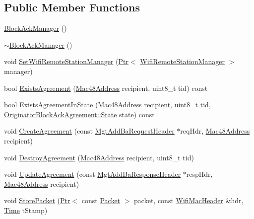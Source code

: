 \subsection*{Public Member Functions}
\begin{DoxyCompactItemize}
\item 
\hyperlink{classns3_1_1BlockAckManager_a7a966d4ae9c3f2172545b76b7ccb8206}{Block\+Ack\+Manager} ()
\item 
\hyperlink{classns3_1_1BlockAckManager_af825fcf5b5c34784c880d95f3d0764af}{$\sim$\+Block\+Ack\+Manager} ()
\item 
void \hyperlink{classns3_1_1BlockAckManager_a7f1b2bae83d50eb0999ed609075571a8}{Set\+Wifi\+Remote\+Station\+Manager} (\hyperlink{classns3_1_1Ptr}{Ptr}$<$ \hyperlink{classns3_1_1WifiRemoteStationManager}{Wifi\+Remote\+Station\+Manager} $>$ manager)
\item 
bool \hyperlink{classns3_1_1BlockAckManager_a4712688bb7764d576c87fd627d3d3aba}{Exists\+Agreement} (\hyperlink{classns3_1_1Mac48Address}{Mac48\+Address} recipient, uint8\+\_\+t tid) const 
\item 
bool \hyperlink{classns3_1_1BlockAckManager_ae13c4678f75ebfda7f63d0521878662b}{Exists\+Agreement\+In\+State} (\hyperlink{classns3_1_1Mac48Address}{Mac48\+Address} recipient, uint8\+\_\+t tid, \hyperlink{classns3_1_1OriginatorBlockAckAgreement_ab33ae8af8c458aca7437a472778e4761}{Originator\+Block\+Ack\+Agreement\+::\+State} state) const 
\item 
void \hyperlink{classns3_1_1BlockAckManager_a44483ff8e6011faf1190dc0f178e66b7}{Create\+Agreement} (const \hyperlink{classns3_1_1MgtAddBaRequestHeader}{Mgt\+Add\+Ba\+Request\+Header} $\ast$req\+Hdr, \hyperlink{classns3_1_1Mac48Address}{Mac48\+Address} recipient)
\item 
void \hyperlink{classns3_1_1BlockAckManager_a4f2adf7575098ab82e1d94466cc9d18a}{Destroy\+Agreement} (\hyperlink{classns3_1_1Mac48Address}{Mac48\+Address} recipient, uint8\+\_\+t tid)
\item 
void \hyperlink{classns3_1_1BlockAckManager_ac5b719210486783186579641e599d362}{Update\+Agreement} (const \hyperlink{classns3_1_1MgtAddBaResponseHeader}{Mgt\+Add\+Ba\+Response\+Header} $\ast$resp\+Hdr, \hyperlink{classns3_1_1Mac48Address}{Mac48\+Address} recipient)
\item 
void \hyperlink{classns3_1_1BlockAckManager_a0d30c0aa10a79c5cc7b06b19e956c5cc}{Store\+Packet} (\hyperlink{classns3_1_1Ptr}{Ptr}$<$ const \hyperlink{classns3_1_1Packet}{Packet} $>$ packet, const \hyperlink{classns3_1_1WifiMacHeader}{Wifi\+Mac\+Header} \&hdr, \hyperlink{classns3_1_1Time}{Time} t\+Stamp)

\end{DoxyCompactItemize}
